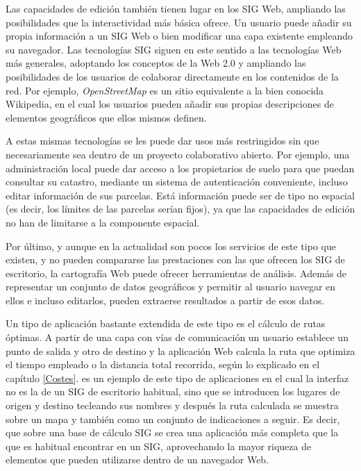 Las capacidades de edición también tienen lugar en los SIG Web, ampliando las posibilidades que la interactividad más básica ofrece. Un usuario puede añadir su propia información a un SIG Web o bien modificar una capa existente empleando su navegador. Las tecnologías SIG siguen en este sentido a las tecnologías Web más generales, adoptando los conceptos de la Web 2.0 y ampliando las posibilidades de los usuarios de colaborar directamente en los contenidos de la red. Por ejemplo, \emph{OpenStreetMap} \cite{webOSM} es un sitio equivalente a la bien conocida Wikipedia, en el cual los usuarios pueden añadir sus propias descripciones de elementos geográficos que ellos mismos definen.

A estas mismas tecnologías se les puede dar usos más restringidos sin que necesariamente sea dentro de un proyecto colaborativo abierto. Por ejemplo, una administración local puede dar acceso a los propietarios de suelo para que puedan consultar su catastro, mediante un sistema de autenticación conveniente, incluso editar información de sus parcelas. Está información puede ser de tipo no espacial (es decir, los límites de las parcelas serían fijos), ya que las capacidades de edición no han de limitarse a la componente espacial.

Por último, y aunque en la actualidad son pocos los servicios de este tipo que existen, y no pueden compararse las prestaciones con las que ofrecen los SIG de escritorio, la cartografía Web puede ofrecer herramientas de análisis. Además de representar un conjunto de datos geográficos y permitir al usuario navegar en ellos e incluso editarlos, pueden extraerse resultados a partir de esos datos. 

Un tipo de aplicación bastante extendida de este tipo es el cálculo de rutas óptimas. A partir de una capa con vías de comunicación un usuario establece un punto de salida y otro de destino y la aplicación Web calcula la ruta que optimiza el tiempo empleado o la distancia total recorrida, según lo explicado en el capítulo \ref{Costes}. \cite{webGuiaCampsa} es un ejemplo de este tipo de aplicaciones en el cual la interfaz no es la de un SIG de escritorio habitual, sino que se introducen los lugares de origen y destino tecleando sus nombres y después la ruta calculada se muestra sobre un mapa y también como un conjunto de indicaciones a seguir. Es decir, que sobre una base de cálculo SIG se crea una aplicación más completa que la que es habitual encontrar en un SIG, aprovechando la mayor riqueza de elementos que pueden utilizarse dentro de un navegador Web.

